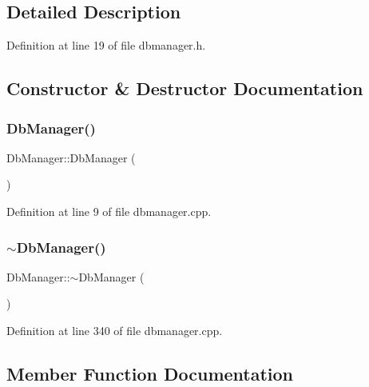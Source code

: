 \subsection{Detailed Description}


Definition at line 19 of file dbmanager.\+h.



\subsection{Constructor \& Destructor Documentation}
\hypertarget{classDbManager_a0d16cf5bba931362e6c581eb1b5ba66a}{}\label{classDbManager_a0d16cf5bba931362e6c581eb1b5ba66a} 
\subsubsection{\texorpdfstring{Db\+Manager()}{DbManager()}}
{\footnotesize\ttfamily Db\+Manager\+::\+Db\+Manager (\begin{DoxyParamCaption}{ }\end{DoxyParamCaption})}



Definition at line 9 of file dbmanager.\+cpp.

\hypertarget{classDbManager_ac5cdf8e5e932d1681ab807d8f256374c}{}\label{classDbManager_ac5cdf8e5e932d1681ab807d8f256374c} 
\subsubsection{\texorpdfstring{$\sim$\+Db\+Manager()}{~DbManager()}}
{\footnotesize\ttfamily Db\+Manager\+::$\sim$\+Db\+Manager (\begin{DoxyParamCaption}{ }\end{DoxyParamCaption})}



Definition at line 340 of file dbmanager.\+cpp.



\subsection{Member Function Documentation}
\hypertarget{classDbManager_a4f063b57678616ccef3515088a04ac51}{}\label{classDbManager_a4f063b57678616ccef3515088a04ac51} 
